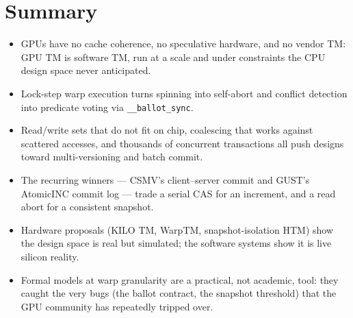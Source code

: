 \section{Summary}

\begin{itemize}
    \item GPUs have no cache coherence, no speculative hardware, and no vendor
          TM: GPU TM is software TM, run at a scale and under constraints the
          CPU design space never anticipated.
    \item Lock-step warp execution turns spinning into self-abort and conflict
          detection into predicate voting via \texttt{\_\_ballot\_sync}.
    \item Read/write sets that do not fit on chip, coalescing that works
          against scattered accesses, and thousands of concurrent transactions
          all push designs toward multi-versioning and batch commit.
    \item The recurring winners --- CSMV's client--server commit and GUST's
          AtomicINC commit log --- trade a serial CAS for an increment, and a
          read abort for a consistent snapshot.
    \item Hardware proposals (KILO TM, WarpTM, snapshot-isolation HTM) show the
          design space is real but simulated; the software systems show it is
          live silicon reality.
    \item Formal models at warp granularity are a practical, not academic,
          tool: they caught the very bugs (the ballot contract, the snapshot
          threshold) that the GPU community has repeatedly tripped over.
\end{itemize}

